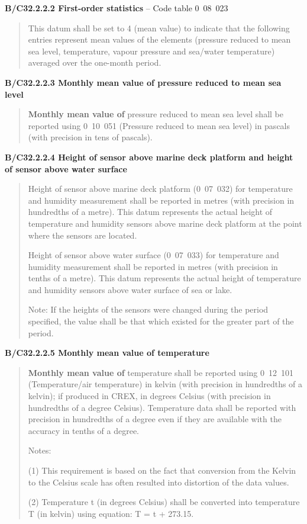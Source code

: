 \textbf{B/C32.2.2.2 First-order statistics} -- Code table 0~08~023

\begin{quote}
This datum shall be set to 4 (mean value) to indicate that the following entries represent mean values of the elements (pressure reduced to mean sea level, temperature, vapour pressure and sea/water temperature) averaged over the one-month period.
\end{quote}

\textbf{B/C32.2.2.3 Monthly mean value of pressure reduced to mean sea level}

\begin{quote}
\textbf{Monthly mean value of} pressure reduced to mean sea level shall be reported using 0~10~051 (Pressure reduced to mean sea level) in pascals (with precision in tens of pascals).
\end{quote}

\textbf{B/C32.2.2.4 Height of sensor above marine deck platform and height of sensor above water surface}

\begin{quote}
Height of sensor above marine deck platform (0~07~032) for temperature and humidity measurement shall be reported in metres (with precision in hundredths of a metre). This datum represents the actual height of temperature and humidity sensors above marine deck platform at the point where the sensors are located.

Height of sensor above water surface (0~07~033) for temperature and humidity measurement shall be reported in metres (with precision in tenths of a metre). This datum represents the actual height of temperature and humidity sensors above water surface of sea or lake.

Note: If the heights of the sensors were changed during the period specified, the value shall be that which existed for the greater part of the period.
\end{quote}

\textbf{B/C32.2.2.5 Monthly mean value of temperature}

\begin{quote}
\textbf{Monthly mean value of} temperature shall be reported using 0~12~101 (Temperature/air temperature) in kelvin (with precision in hundredths of a kelvin); if produced in CREX, in degrees Celsius (with precision in hundredths of a degree Celsius). Temperature data shall be reported with precision in hundredths of a degree even if they are available with the accuracy in tenths of a degree.

Notes:

(1) This requirement is based on the fact that conversion from the Kelvin to the Celsius scale has often resulted into distortion of the data values.

(2) Temperature t (in degrees Celsius) shall be converted into temperature T (in kelvin) using equation: T = t + 273.15.
\end{quote}

